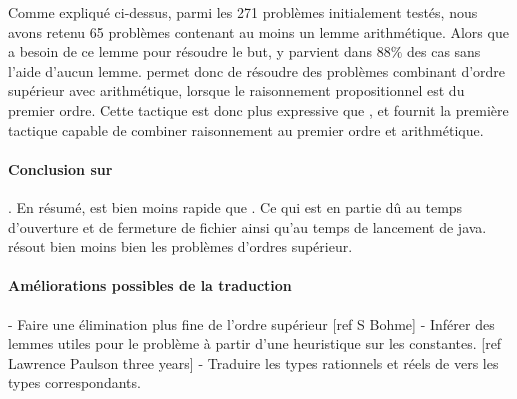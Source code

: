 Comme expliqué ci-dessus, parmi les 271 problèmes initialement testés,
nous avons retenu 65 problèmes contenant au moins un lemme arithmétique.
Alors que \metistac a besoin de ce lemme pour résoudre le but,
\beagletac y parvient dans $88\%$ des cas sans l'aide d'aucun lemme.
\beagletac permet donc de résoudre des problèmes combinant d'ordre
supérieur avec arithmétique, lorsque le raisonnement propositionnel est
du premier ordre. Cette tactique est donc plus expressive que \metistac,
et fournit la première tactique \holfour capable de combiner
raisonnement au premier ordre et arithmétique.

\paragraph {Conclusion sur \beagletac}.
En résumé, \beagletac est bien moins rapide que \metistac. Ce qui est en partie dû au temps d'ouverture et de fermeture de fichier ainsi qu'au temps de lancement de java. \beagletac résout bien moins bien les problèmes d'ordres supérieur.

\paragraph {Améliorations possibles de la traduction}
- Faire une élimination plus fine de l'ordre supérieur [ref S Bohme] 
- Inférer des lemmes utiles pour le problème à partir d'une heuristique sur les constantes. [ref Lawrence Paulson three years]
- Traduire les types rationnels et réels de \holfour vers les types \tff correspondants.

